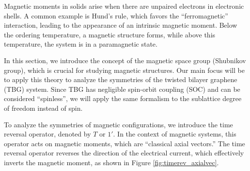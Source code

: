 Magnetic moments in solids arise when there are unpaired electrons in electronic shells. A common example is Hund's rule, which favors the ``ferromagnetic'' interaction, leading to the appearance of an intrinsic magnetic moment. Below the ordering temperature, a magnetic structure forms, while above this temperature, the system is in a paramagnetic state.

In this section, we introduce the concept of the magnetic space group (Shubnikov group), which is crucial for studying magnetic structures. Our main focus will be to apply this theory to analyze the symmetries of the twisted bilayer graphene (TBG) system. Since TBG has negligible spin-orbit coupling (SOC) and can be considered ``spinless'', we will apply the same formalism to the sublattice degree of freedom instead of spin.

To analyze the symmetries of magnetic configurations, we introduce the time reversal operator, denoted by \(T\) or \(1'\). In the context of magnetic systems, this operator acts on magnetic moments, which are ``classical axial vectors.'' The time reversal operator reverses the direction of the electrical current, which effectively inverts the magnetic moment, as shown in Figure \ref{fig:timerev_axialvec}.

